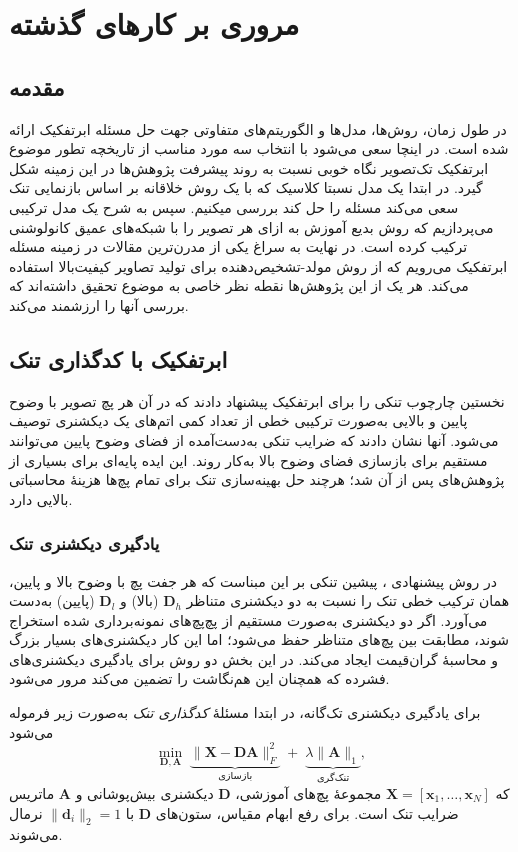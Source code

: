 \chapter{مروری بر کار‌های گذشته}
\label{chp:related_works}
\section{مقدمه}
در طول زمان، روش‌ها، مدل‌ها و الگوریتم‌های متفاوتی جهت حل مسئله ابرتفکیک ارائه شده است. در اینچا سعی می‌شود با انتخاب سه مورد مناسب از تاریخچه تطور موضوع ابرتفکیک تک‌تصویر نگاه خوبی نسبت به روند پیشرفت پژوهش‌ها در این زمینه شکل گیرد. در ابتدا یک مدل نسبتا کلاسیک که با یک روش خلاقانه بر اساس بازنمایی تنک سعی می‌کند مسئله را حل کند بررسی میکنیم. سپس به شرح یک مدل ترکیبی می‌پردازیم که روش بدیع آموزش به ازای هر تصویر را با شبکه‌های عمیق کانولوشنی ترکیب کرده است. در نهایت به سراغ یکی از مدرن‌ترین مقالات در زمینه مسئله ابرتفکیک می‌رویم که از روش مولد-تشخیص‌دهنده برای تولید تصاویر کیفیت‌بالا استفاده می‌کند. هر یک از این پژوهش‌ها نقطه نظر خاصی به موضوع تحقیق داشته‌اند که بررسی آنها را ارزشمند می‌کند.

\section{ابرتفکیک با کدگذاری تنک}
\cite{yang2010scsr} نخستین چارچوب تنکی را برای ابرتفکیک پیشنهاد دادند
که در آن هر پچ تصویر با وضوح پایین و بالایی به‌صورت ترکیبی خطی از
تعداد کمی اتم‌های یک دیکشنری توصیف می‌شود.
آنها نشان دادند که ضرایب تنکی به‌دست‌آمده از فضای وضوح پایین می‌توانند
مستقیم برای بازسازی فضای وضوح بالا به‌کار روند. این ایده پایه‌ای
برای بسیاری از پژوهش‌های پس از آن شد؛ هرچند حل بهینه‌سازی تنک برای
تمام پچ‌ها هزینهٔ محاسباتی بالایی دارد.

\subsection{یادگیری دیکشنری تنک}
\label{subsec:dict_learning}

در روش پیشنهادی \cite{yang2010scsr}، پیشین تنکی بر این مبناست که
هر جفت پچ با وضوح بالا و پایین، همان ترکیب خطی تنک را نسبت به
دو دیکشنری متناظر $\mathbf{D}_{h}$ (بالا) و $\mathbf{D}_{l}$ (پایین)
به‌دست می‌آورد. اگر دو دیکشنری به‌صورت مستقیم از پچ‌پچ‌های نمونه‌برداری
شده استخراج شوند، مطابقت بین پچ‌های متناظر حفظ می‌شود؛ اما این کار
دیکشنری‌های بسیار بزرگ و محاسبهٔ گران‌قیمت ایجاد می‌کند. در این
بخش دو روش برای یادگیری دیکشنری‌های فشرده که همچنان این
هم‌نگاشت را تضمین می‌کند مرور می‌شود.

برای یادگیری دیکشنری تک‌گانه، در ابتدا مسئلهٔ \emph{کدگذاری تنک} به‌صورت زیر فرموله می‌شود
\begin{equation}
	\label{eq:sparse_coding}
	\min_{\mathbf{D},\mathbf{A}}\;
	\underbrace{\|\mathbf{X}-\mathbf{D}\mathbf{A}\|_{F}^{2}}_{\text{بازسازی}}
	\;+\;
	\underbrace{\lambda\|\mathbf{A}\|_{1}}_{\text{تنک‌گری}},
\end{equation}
که $\mathbf{X}=[\mathbf{x}_{1},\dots,\mathbf{x}_{N}]$ مجموعهٔ
پچ‌های آموزشی، $\mathbf{D}$ دیکشنری بیش‌پوشانی و $\mathbf{A}$
ماتریس ضرایب تنک است. برای رفع ابهام مقیاس، ستون‌های $\mathbf{D}$
با $\|\mathbf{d}_{i}\|_{2}=1$ نرمال می‌شوند.

